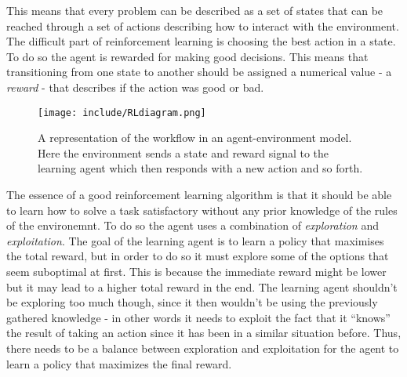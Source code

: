 \documentclass[11pt]{article}
\begin{document}
This means that every problem can be described as a set of states that can be reached
through a set of actions describing how to interact with the environment.
The difficult part of reinforcement learning is choosing the best action in a
state.
To do so the agent is rewarded for making good decisions.
This means that transitioning from one state to another should be assigned a numerical value
- a \textit{reward} - that describes if the action was good or bad.

\begin{figure}[!h]
    \centering
    \texttt{[image: include/RLdiagram.png]}
    \caption{A representation of the workflow in an agent-environment
    model. Here the environment sends a state and reward signal to the
    learning agent which then responds with a new action and so forth.}
    \label{fig:agent_enviroment}
\end{figure}

The essence of a good reinforcement learning algorithm is that it should be able to learn
how to solve a task satisfactory without any prior knowledge of the rules of the environemnt.
To do so the agent uses a combination of \textit{exploration} and \textit{exploitation}.
The goal of the learning agent is to learn a policy that maximises the total reward, but in order to do
so it must explore some of the options that seem suboptimal at first.
This is because the immediate reward might be lower but it may lead to a higher total reward in the end.
The learning agent shouldn't be exploring too much though, since it then wouldn't
be using the previously gathered knowledge - in other words it needs to
exploit the fact that it “knows” the result of taking an action since it has been in
a similar situation before.
Thus, there needs to be a balance between exploration and exploitation for the
agent to learn a policy that maximizes the final reward.
\end{document}
